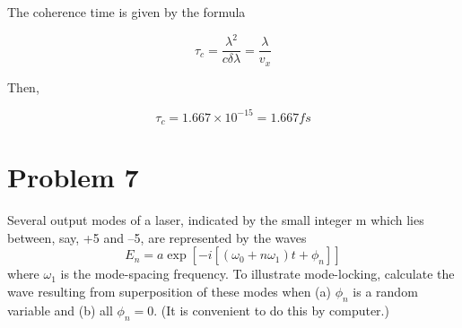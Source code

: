 \documentclass[a4paper,11pt]{article}
\begin{document}
The coherence time is given by the formula

$$\tau_c = \frac{\lambda^2}{c\delta \lambda} = \frac{\lambda}{v_x}$$

Then,

$$\tau_c = 1.667\times 10^{-15} = 1.667 fs $$

\newpage
\section*{Problem 7}
\label{sec:orgc8bb4f5}
Several output modes of a laser, indicated by the small integer m which lies between, say, +5 and –5, are represented by the waves 
\begin{equation}
E_n=a\exp\left[-i[(\omega_0+n\omega_1)t+\phi_n]\right]
\end{equation}
where \(\omega_1\) is the mode-spacing frequency. To illustrate mode-locking, calculate the wave resulting from superposition of these modes when (a) \(\phi_n\) is a random variable and (b) all \(\phi_n = 0\). (It is convenient to do this by computer.) 
\end{document}
